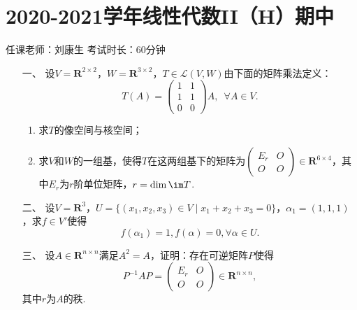 \section*{2020-2021学年线性代数II（H）期中}

\begin{center}
    任课老师：刘康生\hspace{4em} 考试时长：60分钟
\end{center}

\begin{enumerate}
	\item[一、]设$V=\mathbf{R}^{2\times 2}$，$W=\mathbf{R}^{3\times 2}$，$T\in\mathcal{L}(V,W)$由下面的矩阵乘法定义：
	\[T(A)=\begin{pmatrix}
        1 & 1 \\ 1 & 1 \\ 0 & 0
    \end{pmatrix}A,\enspace \forall A\in V.\]
    \begin{enumerate}[label=(\arabic*)]
        \item 求$T$的像空间与核空间；
        \item 求$V$和$W$的一组基，使得$T$在这两组基下的矩阵为$\begin{pmatrix}
            E_r & O \\ O & O
        \end{pmatrix}\in\mathbf{R}^{6\times 4}$，其中$E_r$为$r$阶单位矩阵，$r=\dim\im T$.
    \end{enumerate}
	\item[二、]设$V=\mathbf{R}^3$，$U=\{(x_1,x_2,x_3)\in V\mid x_1+x_2+x_3=0\}$，$\alpha_1=(1,1,1)$，求$f\in V'$使得
	\[f(\alpha_1)=1,f(\alpha)=0,\forall\alpha\in U.\]
	\item[三、]设$A\in\mathbf{R}^{n\times n}$满足$A^2=A$，证明：存在可逆矩阵$P$使得
	\[P^{-1}AP=\begin{pmatrix}
        E_r & O \\ O & O
    \end{pmatrix}\in\mathbf{R}^{n\times n},\]
    其中$r$为$A$的秩.
\end{enumerate}

\clearpage
